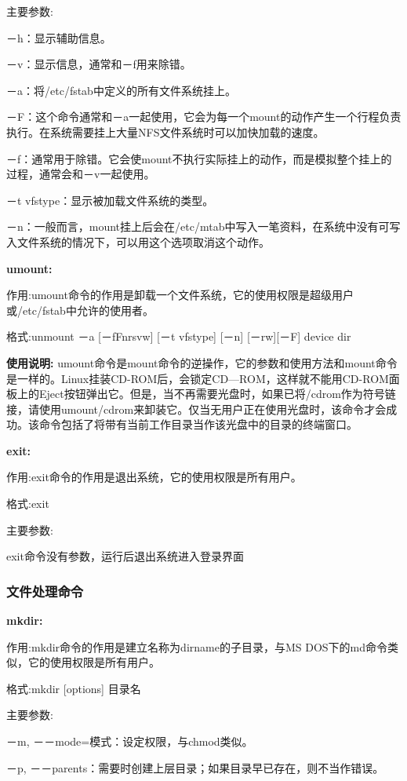 主要参数:

－h：显示辅助信息。

－v：显示信息，通常和－f用来除错。

－a：将/etc/fstab中定义的所有文件系统挂上。

－F：这个命令通常和－a一起使用，它会为每一个mount的动作产生一个行程负责执行。在系统需要挂上大量NFS文件系统时可以加快加载的速度。

－f：通常用于除错。它会使mount不执行实际挂上的动作，而是模拟整个挂上的过程，通常会和－v一起使用。

－t vfstype：显示被加载文件系统的类型。

－n：一般而言，mount挂上后会在/etc/mtab中写入一笔资料，在系统中没有可写入文件系统的情况下，可以用这个选项取消这个动作。


\textbf{umount:}

作用:umount命令的作用是卸载一个文件系统，它的使用权限是超级用户或/etc/fstab中允许的使用者。

格式:unmount －a [－fFnrsvw] [－t vfstype] [－n] [－rw][－F] device dir

\textbf{使用说明:}
umount命令是mount命令的逆操作，它的参数和使用方法和mount命令是一样的。Linux挂装CD-ROM后，会锁定CD—ROM，这样就不能用CD-ROM面板上的Eject按钮弹出它。但是，当不再需要光盘时，如果已将/cdrom作为符号链接，请使用umount/cdrom来卸装它。仅当无用户正在使用光盘时，该命令才会成功。该命令包括了将带有当前工作目录当作该光盘中的目录的终端窗口。

\textbf{exit:}

作用:exit命令的作用是退出系统，它的使用权限是所有用户。

格式:exit

主要参数:

exit命令没有参数，运行后退出系统进入登录界面

\subsubsection{文件处理命令}

\textbf{mkdir:}

作用:mkdir命令的作用是建立名称为dirname的子目录，与MS DOS下的md命令类似，它的使用权限是所有用户。

格式:mkdir [options] 目录名

主要参数:

－m, －－mode=模式：设定权限，与chmod类似。

－p, －－parents：需要时创建上层目录；如果目录早已存在，则不当作错误。

